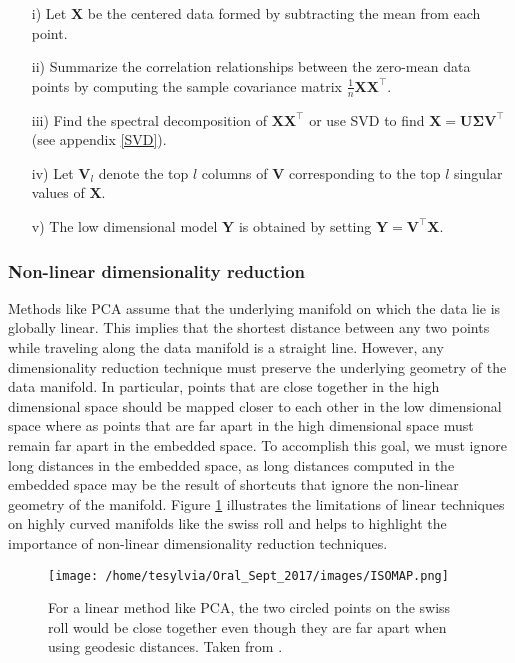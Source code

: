 \begin{itemize}
\item[i)] Let $\textbf{X}$ be the centered data formed by subtracting the mean from each point.
\item[ii)] Summarize the correlation relationships between the zero-mean data points by computing the sample covariance matrix $\frac{1}{n}\textbf{XX}^{\top}.$
\item[iii)] Find the spectral decomposition of $\textbf{XX}^{\top}$ or 
use SVD to find $\textbf{X} = \bm{U\Sigma V^{\top}}$  (see appendix \ref{SVD}).
\item[iv)] Let $\bm{V}_{l}$ denote the top $l$ columns of $\textbf{V}$ corresponding to the  top $l$ singular values of $\textbf{X}$.
\item[v)] The low dimensional model $\textbf{Y}$ is obtained by setting 
$\textbf{Y} = \textbf{V}^{\top}\textbf{X}$.
\end{itemize}

\subsubsection{Non-linear dimensionality reduction}

Methods like PCA assume that the underlying manifold on which the data lie is globally linear. This implies that the shortest distance between any two points while traveling along the data manifold is a straight line.
However, any dimensionality reduction technique must preserve the underlying geometry of the data manifold. In particular, points that are close together in the high dimensional space should be mapped closer to each other in the low dimensional space where as points that are far apart in the high dimensional space must remain far apart in the embedded space. To accomplish this goal, we must ignore long distances in the embedded space, as long distances computed in the embedded space
may be the result of shortcuts that ignore the non-linear geometry of the manifold.
Figure \ref{fig:Swiss roll} illustrates the limitations of linear techniques on highly curved manifolds like the swiss roll and helps to highlight the importance of non-linear dimensionality reduction techniques.

\begin{figure}[h]
\centering
\texttt{[image: /home/tesylvia/Oral\_Sept\_2017/images/ISOMAP.png]}
\caption{For a linear method like PCA, the two circled points on the swiss roll would be close together even though they are far apart when using geodesic distances. Taken from \cite{TenenbaumJB2000Aggf}.}
      \label{fig:Swiss roll}
\end{figure}


